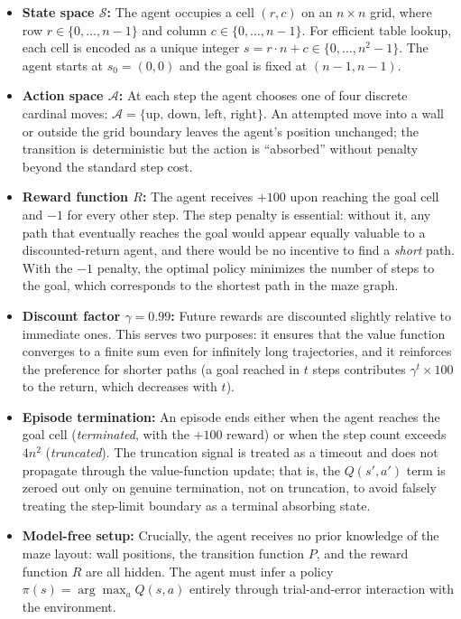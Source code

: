 \documentclass[11pt]{article}
\begin{document}
\begin{itemize}
    \item \textbf{State space $\mathcal{S}$:} The agent occupies a cell $(r, c)$ on an $n \times n$ grid, where row $r \in \{0, \ldots, n-1\}$ and column
$c \in \{0, \ldots, n-1\}$. For efficient table lookup, each cell is
encoded as a unique integer $s = r \cdot n + c \in \{0, \ldots, n^2-1\}$.
The agent starts at $s_0 = (0, 0)$ and the goal is fixed at
$(n-1, n-1)$.

    \item \textbf{Action space $\mathcal{A}$:} At each step the agent chooses one
of four discrete cardinal moves: $\mathcal{A} = \{\text{up, down, left,
right}\}$. An attempted move into a wall or outside the grid boundary
leaves the agent's position unchanged; the transition is deterministic
but the action is ``absorbed'' without penalty beyond the standard step
cost.

    \item \textbf{Reward function $R$:} The agent receives $+100$ upon reaching the goal cell and $-1$ for every other step. The step penalty is essential: without it, any path that eventually reaches the goal would appear equally valuable to a discounted-return agent, and there would be no incentive to find a \emph{short} path. With the $-1$ penalty, the optimal policy minimizes the number of steps to the goal, which corresponds to the shortest path in the maze graph.

    \item \textbf{Discount factor $\gamma = 0.99$:} Future rewards are discounted slightly relative to immediate ones. This serves two purposes: it ensures that the value function converges to a finite sum even for infinitely long trajectories, and it reinforces the preference for shorter paths (a goal reached in $t$ steps contributes $\gamma^t \times 100$ to the return, which decreases with $t$).

    \item \textbf{Episode termination:} An episode ends either when the agent reaches the goal cell (\emph{terminated}, with the $+100$ reward) or when the step count exceeds $4n^2$ (\emph{truncated}). The truncation signal is treated as a timeout and does not propagate through the value-function update; that is, the $Q(s', a')$ term is zeroed out only on genuine termination, not on truncation, to avoid falsely treating the step-limit boundary as a terminal absorbing state.

    \item \textbf{Model-free setup:} Crucially, the agent receives no prior knowledge of the maze layout: wall positions, the transition function $P$, and the reward function $R$ are all hidden. The agent must infer a policy $\pi(s) = \arg\max_a Q(s, a)$ entirely through trial-and-error interaction with the environment.
\end{itemize}
\end{document}
